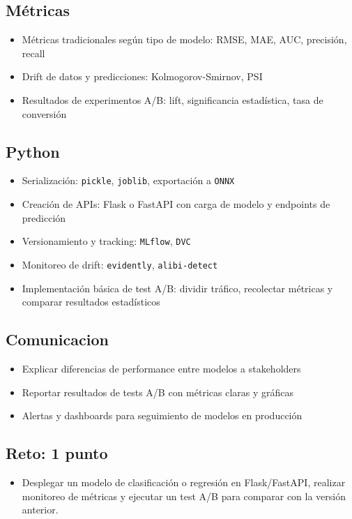 \documentclass[12pt,a4paper,openany,oneside]{book}
\begin{document}
\begin{itemize}
\subsection{Métricas}
\begin{itemize}
    \item Métricas tradicionales según tipo de modelo: RMSE, MAE, AUC, precisión, recall
    \item Drift de datos y predicciones: Kolmogorov-Smirnov, PSI
    \item Resultados de experimentos A/B: lift, significancia estadística, tasa de conversión
\end{itemize}

\subsection{Python}
\begin{itemize}
    \item Serialización: \texttt{pickle}, \texttt{joblib}, exportación a \texttt{ONNX}
    \item Creación de APIs: Flask o FastAPI con carga de modelo y endpoints de predicción
    \item Versionamiento y tracking: \texttt{MLflow}, \texttt{DVC}
    \item Monitoreo de drift: \texttt{evidently}, \texttt{alibi-detect}
    \item Implementación básica de test A/B: dividir tráfico, recolectar métricas y comparar resultados estadísticos
\end{itemize}

\subsection{Comunicacion}
\begin{itemize}
    \item Explicar diferencias de performance entre modelos a stakeholders
    \item Reportar resultados de tests A/B con métricas claras y gráficas
    \item Alertas y dashboards para seguimiento de modelos en producción
\end{itemize}

\subsection{Reto: 1 punto}
\begin{itemize}
    \item Desplegar un modelo de clasificación o regresión en Flask/FastAPI, realizar monitoreo de métricas y ejecutar un test A/B para comparar con la versión anterior.
\end{itemize}


\end{itemize}
\end{document}

